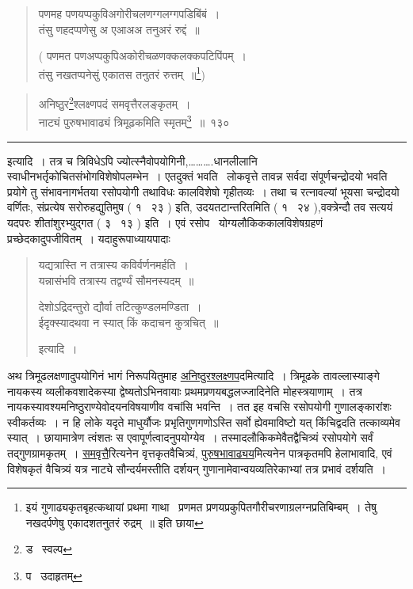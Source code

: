 \documentclass[11pt, openany]{book}
\begin{document}
\begin{quote}
{\qt पणमह पणयप्पकुविअगोरीचलणग्गलग्गपडिबिंबं~।\\
तंसु णहदप्पणेसु अ एआअअ तनुअरं रुद्दं~॥

( पणमत पणअप्पकुपिअकोरीचळणक्कलक्कपटिपिंपम्~।\\
तंसु नखतप्पनेसुं एकातस तनुतरं रुत्तम्~॥\renewcommand{\thefootnote}{*}\footnote{इयं गुणाढ्यकृतबृहत्कथायां प्रथमा गाथा \textendash\ प्रणमत प्रणयप्रकुपितगौरीचरणाग्रलग्नप्रतिबिम्बम्~। तेषु नखदर्पणेषु एकादशतनुतरं रुद्रम्~॥ इति छाया})}
\end{quote}

\newpage

\begin{quote}
{\na अनिष्ठुर\renewcommand{\thefootnote}{1}\footnote{ड \textendash\ स्वल्प}श्लक्ष्णपदं समवृत्तैरलङ्कृतम्~।\\
नाट्यं पुरुषभावाढ्यं त्रिमूढकमिति स्मृतम्\renewcommand{\thefootnote}{2}\footnote{प \textendash\ उदाहृतम्}~॥~१३०}
\end{quote}

\hrule

\vspace{2mm}
\noindent
इत्यादि~। तत्र च त्रिविधेऽपि ज्योत्स्नैवोपयोगिनी,\ldots\ldots\ldots.धानलीलानि स्वाधीनभर्तृकोचितसंभोगविशेषोपलम्भेन~। एतदुक्तं भवति \textendash\ लोकवृत्ते तावन्न सर्वदा संपूर्णचन्द्रोदयो भवति प्रयोगे तु संभावनागर्भतया रसोपयोगी तथाविधः कालविशेषो गृहीतव्यः~। तथा च रत्नावल्यां भूयसा चन्द्रोदयो वर्णितः, {\qt संप्रत्येष सरोरुहद्युतिमुष} ( १ \textendash\ २३ ) इति, {\qt उदयतटान्तरित}मिति ( १ \textendash\ २४ ),{\qt वक्त्रेन्दौ तव सत्ययं यदपरः शीतांशुरभ्युद्गत} ( ३ \textendash\ १३ ) इति~। एवं रसोप \textendash\ योग्यलौकिककालविशेषग्रहणं प्रच्छेदकादुपजीवितम्~। यदाहुरूपाध्यायपादाः \textendash

\begin{quote}
{\qt यद्यत्रास्ति न तत्रास्य कविर्वर्णनमर्हति~।\\
यन्नासंभवि तत्रास्य तद्वर्ण्यं सौमनस्यदम्~॥

देशोऽद्रिदन्तुरो द्यौर्वा तटित्कुण्डलमण्डिता~।\\
ईदृक्स्यादथवा न स्यात् किं कदाचन कुत्रचित्~॥} इत्यादि~।
\end{quote}

\noindent
अथ त्रिमूढलक्षणादुपयोगिनं भागं निरूपयितुमाह \underline{अनिष्ठुरश्लक्ष्णप}दमित्यादि~। त्रिमूढके तावल्लास्याङ्गे नायकस्य व्यलीकवशादेकस्या द्वेष्यतोऽभिनवायाः प्रथमप्रणयबद्धलज्जादिनेति मोहस्त्रयाणाम्~। तत्र नायकस्यावश्यमनिष्ठुराण्येवोदयनविषयाणीव वचांसि भवन्ति~। तत इह वचसि रसोपयोगी गुणालङ्कारांशः स्वीकर्तव्यः~। न हि लोके यदृते माधुर्यौजः प्रभृतिगुणगणोऽस्ति सर्वो ह्येवमाविष्टो यत् किंचिद्वदति तत्काव्यमेव स्यात्~। छायामात्रेण त्वंशतः स एवापूर्णत्वादनुपयोग्येव~। तस्मादलौकिकमेवैतद्वैचित्र्यं रसोपयोगे सर्वं तद्गुणग्रामकृतम्~। \underline{समवृत्तै}रित्यनेन वृत्तकृतवैचित्र्यं, \underline{पुरुषभावाढ्यय}मित्यनेन पात्रकृतमपि हेलाभावादि, एवं विशेषकृतं वैचित्र्यं यत्र नाट्ये सौन्दर्यमस्तीति दर्शयन् गुणानामेवान्वयव्यतिरेकाभ्यां तत्र प्रभावं दर्शयति~।
\end{document}
